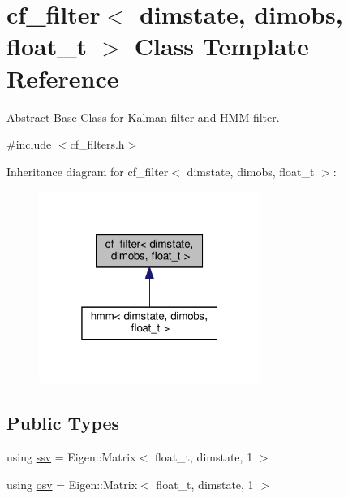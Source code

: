 \hypertarget{classcf__filter}{}\section{cf\+\_\+filter$<$ dimstate, dimobs, float\+\_\+t $>$ Class Template Reference}
\label{classcf__filter}


Abstract Base Class for Kalman filter and H\+MM filter.  




{\ttfamily \#include $<$cf\+\_\+filters.\+h$>$}



Inheritance diagram for cf\+\_\+filter$<$ dimstate, dimobs, float\+\_\+t $>$\+:
\nopagebreak
\begin{figure}[H]
\begin{center}
\leavevmode
\includegraphics[width=205pt]{classcf__filter__inherit__graph}
\end{center}
\end{figure}
\subsection*{Public Types}
\begin{DoxyCompactItemize}
\item 
using \hyperlink{classcf__filter_ad4bce534d6b7a494dae851846037c94b}{ssv} = Eigen\+::\+Matrix$<$ float\+\_\+t, dimstate, 1 $>$
\item 
using \hyperlink{classcf__filter_a91d9961b2ecd202b1400c401434b392d}{osv} = Eigen\+::\+Matrix$<$ float\+\_\+t, dimstate, 1 $>$
\end{DoxyCompactItemize}

